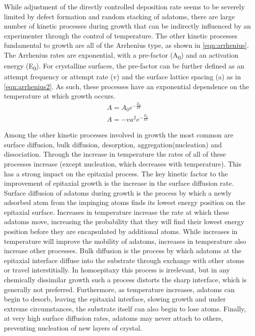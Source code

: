 While adjustment of the directly controlled deposition rate seems to be severely limited by defect formation and random stacking of adatoms, there are large number of kinetic processes during growth that can be indirectly influenced by an experimenter through the control of temperature.
The other kinetic processes fundamental to growth are all of the Arrhenius type, as shown in \cref{eqn:arrhenius}.
The Arrhenius rates are exponential, with a pre-factor (A\textsubscript{0}) and an activation energy (E\textsubscript{0}).
For crystalline surfaces, the pre-factor can be further defined as an attempt frequency or attempt rate (v) and the surface lattice spacing (a) as in \cref{eqn:arrhenius2}\cite{Einax2013}.
As such, these processes have an exponential dependence on the temperature at which growth occurs.
\begin{align}
    A = A_0 e^{-\frac{E_0}{kT}} \label{eqn:arrhenius} \\
    A = - v a^2 e^{-\frac{E_0}{kT}} \label{eqn:arrhenius2}
\end{align}

Among the other kinetic processes involved in growth the most common are surface diffusion, bulk diffusion, desorption, aggregation(nucleation) and dissociation.
Through the increase in temperature the rates of all of these processes increase (except nucleation, which decreases with temperature).
This has a strong impact on the epitaxial process.
The key kinetic factor to the improvement of epitaxial growth is the increase in the surface diffusion rate.
Surface diffusion of adatoms during growth is the process by which a newly adsorbed atom from the impinging atoms finds its lowest energy position on the epitaxial surface.
Increases in temperature increase the rate at which these adatoms move, increasing the probability that they will find their lowest energy position before they are encapsulated by additional atoms.
While increases in temperature will improve the mobility of adatoms, increases in temperature also increase other processes.
Bulk diffusion is the process by which adatoms at the epitaxial interface diffuse into the substrate through exchange with other atoms or travel interstitially.
In homoepitaxy this process is irrelevant, but in any chemically dissimilar growth such a process distorts the sharp interface, which is generally not preferred.
Furthermore, as temperature increases, adatoms can begin to desorb, leaving the epitaxial interface, slowing growth and under extreme circumstances, the substrate itself can also begin to lose atoms.
Finally, at very high surface diffusion rates, adatoms may never attach to others, preventing nucleation of new layers of crystal.

